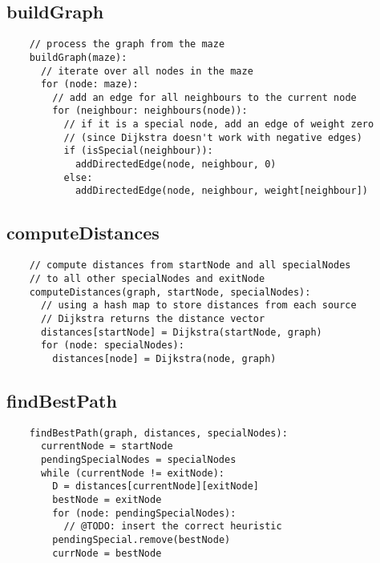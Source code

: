 \documentclass[12pt]{report}
\begin{document}
\subsection{buildGraph}
\begin{tcolorbox}
\begin{verbatim}
    // process the graph from the maze
    buildGraph(maze):
      // iterate over all nodes in the maze
      for (node: maze):
        // add an edge for all neighbours to the current node
        for (neighbour: neighbours(node)):
          // if it is a special node, add an edge of weight zero
          // (since Dijkstra doesn't work with negative edges)
          if (isSpecial(neighbour)):
            addDirectedEdge(node, neighbour, 0)
          else:
            addDirectedEdge(node, neighbour, weight[neighbour])
\end{verbatim}
\end{tcolorbox}

\subsection{computeDistances}
\begin{tcolorbox}
\begin{verbatim}
    // compute distances from startNode and all specialNodes
    // to all other specialNodes and exitNode
    computeDistances(graph, startNode, specialNodes):
      // using a hash map to store distances from each source
      // Dijkstra returns the distance vector
      distances[startNode] = Dijkstra(startNode, graph)
      for (node: specialNodes):
        distances[node] = Dijkstra(node, graph)
\end{verbatim}
\end{tcolorbox}

\subsection{findBestPath}
\begin{tcolorbox}
\begin{verbatim}
    findBestPath(graph, distances, specialNodes):
      currentNode = startNode
      pendingSpecialNodes = specialNodes
      while (currentNode != exitNode):
        D = distances[currentNode][exitNode]
        bestNode = exitNode
        for (node: pendingSpecialNodes):
          // @TODO: insert the correct heuristic
        pendingSpecial.remove(bestNode)
        currNode = bestNode
\end{verbatim}
\end{tcolorbox}
\end{document}
